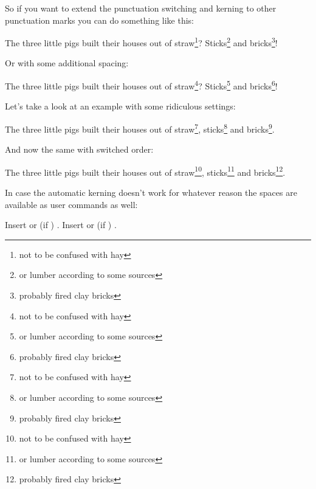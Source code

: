 \documentclass[load-preamble+]{cnltx-doc}
\begin{document}
So if you want to extend the punctuation switching and kerning to other punctuation
marks you can do something like this:
\begin{example}
  \begin{minipage}{.4\linewidth}
    \noindent The three little pigs built their houses
    out of straw\footnote{not to be confused with hay}?
    Sticks\footnote{or lumber according to some sources}
    and bricks\footnote{probably fired clay bricks}!
  \end{minipage}
\end{example}

Or with some additional spacing:
\begin{example}
  \begin{minipage}{.4\linewidth}
    \noindent The three little pigs built their houses
    out of straw\footnote{not to be confused with hay}?
    Sticks\footnote{or lumber according to some sources}
    and bricks\footnote{probably fired clay bricks}!
  \end{minipage}
\end{example}

Let's take a look at an example with some ridiculous settings:
\begin{example}
  \begin{minipage}{.4\linewidth}
    \noindent The three little pigs built their houses
    out of straw\footnote{not to be confused with hay},
    sticks\footnote{or lumber according to some sources}
    and bricks\footnote{probably fired clay bricks}.
  \end{minipage}
\end{example}

And now the same with switched order:
\begin{example}
  \begin{minipage}{.4\linewidth}
    \noindent The three little pigs built their houses
    out of straw\footnote{not to be confused with hay},
    sticks\footnote{or lumber according to some sources}
    and bricks\footnote{probably fired clay bricks}.
  \end{minipage}
\end{example}

In case the automatic kerning doesn't work for whatever reason the spaces are
available as user commands as well:
\begin{commands}
    Insert  or (if )
    . 
    Insert  or (if )
    .
\end{commands}
\end{document}
